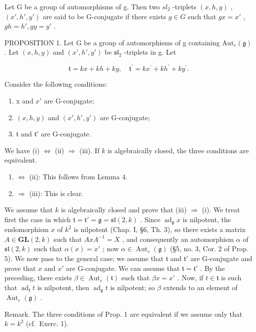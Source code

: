 Let G be a group of automorphisms of g. Then two \(sl_{2}\) -triplets \((x,h,y)\) , \((x',h',y')\) are said to be G-conjugate if there exists \(g\in G\) such that \(gx=x'\) , \(gh=h',gy=y'\) .

PROPOSITION 1. Let G be a group of automorphisms of g containing \(\mathrm{Aut}_e(\mathfrak{g})\) . Let \((x,h,y)\) and \((x',h',y')\) be \(\mathfrak{sl}_2\) -triplets in g. Let

\[
\mathfrak {t} = k x + k h + k y, \quad \mathfrak {t} ^ {\prime} = k x ^ {\prime} + k h ^ {\prime} + k y ^ {\prime}.
\]

Consider the following conditions:

\begin{enumerate}
\def\labelenumi{(\roman{enumi})}
\item
  x and \(x'\) are G-conjugate;
\item
  \((x, h, y)\) and \((x', h', y')\) are G-conjugate;
\item
  \(\mathfrak{t}\) and \(\mathfrak{t}'\) are G-conjugate.
\end{enumerate}

We have (i) \(\Longleftrightarrow\) (ii) \(\Longrightarrow\) (iii). If \(k\) is algebraically closed, the three conditions are equivalent.

\begin{enumerate}
\def\labelenumi{(\roman{enumi})}
\item
  \(\Longleftrightarrow\) (ii): This follows from Lemma 4.
\item
  \(\Longrightarrow\) (iii): This is clear.
\end{enumerate}

We assume that \(k\) is algebraically closed and prove that (iii) \(\Longrightarrow\) (i). We treat first the case in which \(\mathfrak{t} = \mathfrak{t}' = \mathfrak{g} = \mathfrak{sl}(2, k)\) . Since \(\operatorname{ad}_{\mathfrak{g}} x\) is nilpotent, the endomorphism \(x\) of \(k^2\) is nilpotent (Chap. I, §6, Th. 3), so there exists a matrix \(A \in \mathbf{GL}(2, k)\) such that \(AxA^{-1} = X\) , and consequently an automorphism \(\alpha\) of \(\mathfrak{sl}(2, k)\) such that \(\alpha(x) = x'\) ; now \(\alpha \in \operatorname{Aut}_e(\mathfrak{g})\) (§5, no. 3, Cor. 2 of Prop. 5). We now pass to the general case; we assume that \(\mathfrak{t}\) and \(\mathfrak{t}'\) are G-conjugate and prove that \(x\) and \(x'\) are G-conjugate. We can assume that \(\mathfrak{t} = \mathfrak{t}'\) . By the preceding, there exists \(\beta \in \operatorname{Aut}_e(\mathfrak{t})\) such that \(\beta x = x'\) . Now, if \(t \in \mathfrak{t}\) is such that \(\operatorname{ad}_{\mathfrak{t}} t\) is nilpotent, then \(\operatorname{ad}_{\mathfrak{g}} t\) is nilpotent; so \(\beta\) extends to an element of \(\operatorname{Aut}_e(\mathfrak{g})\) .

Remark. The three conditions of Prop. 1 are equivalent if we assume only that \(k = k^2\) (cf.~Exerc. 1).

